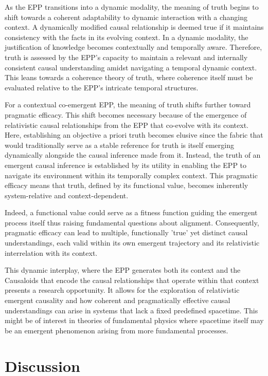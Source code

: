 \documentclass{article}
\begin{document}
As the EPP transitions into a dynamic modality, the meaning of truth begins to shift towards a coherent adaptability to dynamic interaction with a changing context. A dynamically modified causal relationship is deemed true if it maintains consistency with the facts in its evolving context. In a dynamic modality,  the justification of knowledge becomes contextually and temporally aware. Therefore, truth is assessed by the EPP's capacity to maintain a relevant and internally consistent causal understanding amidst navigating a temporal dynamic context.  This leans towards a coherence theory of truth, where coherence itself must be evaluated relative to the EPP’s intricate temporal structures.

For a contextual co-emergent EPP, the meaning of truth shifts further toward pragmatic efficacy. This shift becomes necessary because of the emergence of relativistic causal relationships from the EPP that co-evolve with its context. Here, establishing an objective a priori truth becomes elusive since the fabric that would traditionally serve as a stable reference for truth is itself emerging dynamically alongside the causal inference made from it. Instead, the truth of an emergent causal inference is established by its utility in enabling the EPP to navigate its environment within its temporally complex context.
This pragmatic efficacy means that truth, defined by its functional value, becomes inherently system-relative and context-dependent.

Indeed, a functional value could serve as a fitness function guiding the emergent process itself thus raising fundamental questions about alignment. Consequently, pragmatic efficacy can lead to multiple, functionally 'true' yet distinct causal understandings, each valid within its own emergent trajectory and its relativistic interrelation with its context.

This dynamic interplay, where the EPP generates both its context and the Causaloids that encode the causal relationships that operate within that context presents a research opportunity.
It allows for the exploration of relativistic emergent causality and how coherent and pragmatically effective causal understandings can arise in systems that lack a fixed predefined spacetime. This might be of interest in theories of fundamental physics where spacetime itself may be an emergent phenomenon arising from more fundamental processes.


\section{Discussion}
\label{sec:Discussion}
\end{document}
